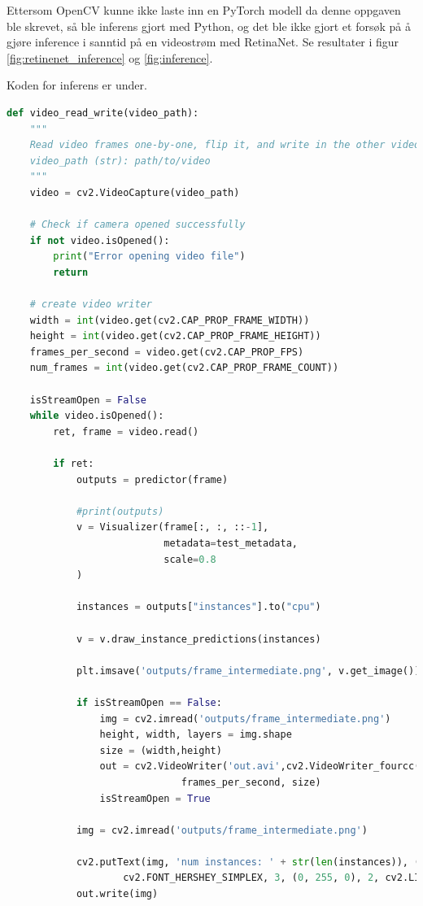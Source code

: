 Ettersom OpenCV kunne ikke laste inn en PyTorch modell da denne oppgaven ble skrevet, så ble inferens gjort med Python, og det ble ikke gjort et forsøk på å gjøre inference i sanntid på en videostrøm med RetinaNet. Se resultater i figur \ref{fig:retinenet_inference} og \ref{fig:inference}.

Koden for inferens er under.

\begin{lstlisting}[language=Python, caption=Inferens RetinaNet i inference.py]
def video_read_write(video_path):
    """
    Read video frames one-by-one, flip it, and write in the other video.
    video_path (str): path/to/video
    """
    video = cv2.VideoCapture(video_path)
    
    # Check if camera opened successfully
    if not video.isOpened(): 
        print("Error opening video file")
        return
    
    # create video writer
    width = int(video.get(cv2.CAP_PROP_FRAME_WIDTH))
    height = int(video.get(cv2.CAP_PROP_FRAME_HEIGHT))
    frames_per_second = video.get(cv2.CAP_PROP_FPS)
    num_frames = int(video.get(cv2.CAP_PROP_FRAME_COUNT))
    
    isStreamOpen = False
    while video.isOpened():
        ret, frame = video.read()
        
        if ret:
            outputs = predictor(frame)

            #print(outputs)
            v = Visualizer(frame[:, :, ::-1],
                           metadata=test_metadata, 
                           scale=0.8
            )

            instances = outputs["instances"].to("cpu")

            v = v.draw_instance_predictions(instances)

            plt.imsave('outputs/frame_intermediate.png', v.get_image())

            if isStreamOpen == False:
                img = cv2.imread('outputs/frame_intermediate.png')
                height, width, layers = img.shape
                size = (width,height)
                out = cv2.VideoWriter('out.avi',cv2.VideoWriter_fourcc(*'DIVX'),
                		      frames_per_second, size)
                isStreamOpen = True

            img = cv2.imread('outputs/frame_intermediate.png')

            cv2.putText(img, 'num instances: ' + str(len(instances)), (5,100),
            		cv2.FONT_HERSHEY_SIMPLEX, 3, (0, 255, 0), 2, cv2.LINE_AA)
            out.write(img)


\end{lstlisting}
